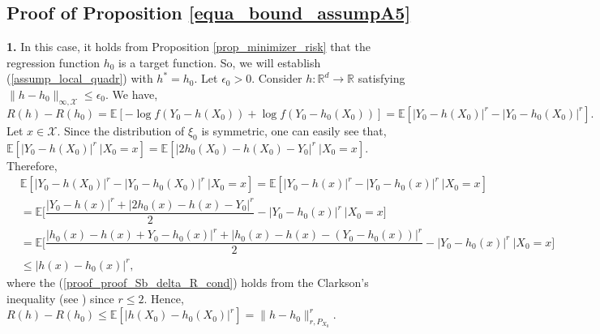 \documentclass[10pt,twoside]{article}
\numberwithin{equation}{section}
\newcommand{\E}{\ensuremath{\mathbb{E}}}
\newcommand{\R}{\ensuremath{\mathbb{R}}}
\newcommand{\mx}{ { \mathcal{X}} }
\begin{document}
\subsection{Proof of Proposition \ref{equa_bound_assumpA5}}
 \noindent
\textbf{1.} In this case, it holds from Proposition \ref{prop_minimizer_risk} that the regression function $h_0$ is a target function. So, we will establish (\ref{assump_local_quadr}) with $h^* = h_0$.
%
Let $\epsilon_0 > 0$. Consider $h: \R^d \rightarrow \R$ satisfying $\|h - h_0\|_{\infty, \mx} \leq \epsilon_0$.
%
We have,
%
\begin{equation}\label{proof_proof_Sb_delta_R}
  R(h) - R(h_0) =  \E [ -\log f(Y_0 - h(X_0)) +\log f(Y_0 - h_0(X_0)) ] = \E [ | Y_0 - h(X_0) |^r -| Y_0 - h_0(X_0) |^r ] . 
\end{equation} 
%
%
Let $ x \in \mx$. Since the distribution of $\xi_0$ is symmetric, one can easily see that, $\E[|Y_0 - h(X_0)|^r ~| X_0=x ] = \E[|2 h_0(X_0) - h(X_0) -Y_0|^r ~| X_0=x ]$.
%
Therefore,
%
\begin{align}
 \nonumber &\E [ | Y_0 - h(X_0) |^r -| Y_0 - h_0(X_0) |^r  ~| X_0 = x] = \E [ | Y_0 - h(x) |^r -| Y_0 - h_0(x) |^r  ~| X_0 = x] \\ 
 \nonumber  &= \E \Big[  \dfrac{|Y_0 - h(x) |^r + |2h_0(x) - h(x) - Y_0|^r}{2} - | Y_0 - h_0(x) |^r  ~| X_0 = x \Big] \\
 \nonumber  &= \E \Big[  \dfrac{| h_0(x) - h(x) + Y_0 - h_0(x) |^r + |h_0(x) - h(x) - (Y_0 - h_0(x) )|^r}{2} - | Y_0 - h_0(x) |^r  ~| X_0 = x \Big]\\ 
 \label{proof_proof_Sb_delta_R_cond} &\leq   | h(x) - h_0(x)|^r ,
\end{align} 
 where the (\ref{proof_proof_Sb_delta_R_cond}) holds from the Clarkson's inequality (see \cite{clarkson1936uniformly}) since $r \leq 2$.
Hence, $R(h) - R(h_0) \leq \E[ | h(X_0) - h_0(X_0)|^r ] = \| h - h_0\|^r_{r, P_{X_0}}$.
\end{document}
